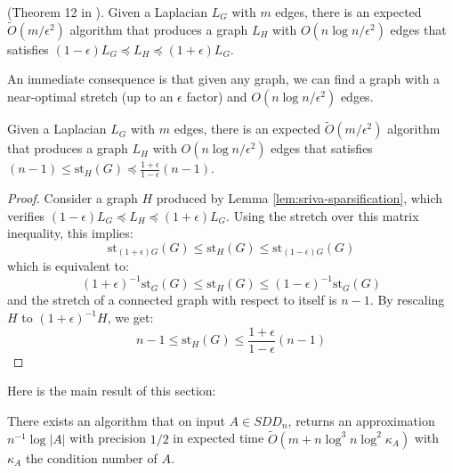 \begin{lemma}\label{lem:sriva-sparsification}(Theorem 12 in \cite{Spielman2009}).
Given a Laplacian $L_{G}$ with $m$ edges, there is an expected $\tilde{O}\left(m/\epsilon^{2}\right)$
algorithm that produces a graph $L_{H}$ with $O\left(n\log n/\epsilon^{2}\right)$
edges that satisfies $\left(1-\epsilon\right)L_{G}\preceq L_{H}\preceq\left(1+\epsilon\right)L_{G}$.

\end{lemma}

An immediate consequence is that given any graph, we can find a graph
with a near-optimal stretch (up to an $\epsilon$ factor) and $O\left(n\log n/\epsilon^{2}\right)$
edges.

\begin{lemma}\label{lem:low-stretch-bounding}Given a Laplacian $L_{G}$
with $m$ edges, there is an expected $\tilde{O}\left(m/\epsilon^{2}\right)$
algorithm that produces a graph $L_{H}$ with $O\left(n\log n/\epsilon^{2}\right)$
edges that satisfies $\left(n-1\right)\leq\text{st}_{H}\left(G\right)\preceq\frac{1+\epsilon}{1-\epsilon}\left(n-1\right)$.

\end{lemma}

\begin{proof}Consider a graph $H$ produced by Lemma \ref{lem:sriva-sparsification},
which verifies $\left(1-\epsilon\right)L_{G}\preceq L_{H}\preceq\left(1+\epsilon\right)L_{G}$.
Using the stretch over this matrix inequality, this implies: 
\[
\text{st}_{\left(1+\epsilon\right)G}\left(G\right)\leq\text{st}_{H}\left(G\right)\leq\text{st}_{\left(1-\epsilon\right)G}\left(G\right)
\]
which is equivalent to: 
\[
\left(1+\epsilon\right)^{-1}\text{st}_{G}\left(G\right)\leq\text{st}_{H}\left(G\right)\leq\left(1-\epsilon\right)^{-1}\text{st}_{G}\left(G\right)
\]
and the stretch of a connected graph with respect to itself is $n-1$.
By rescaling $H$ to $\left(1+\epsilon\right)^{-1}H$, we get: 
\[
n-1\leq\text{st}_{H}\left(G\right)\leq\frac{1+\epsilon}{1-\epsilon}\left(n-1\right)
\]


\end{proof}

Here is the main result of this section:

\begin{proposition}There exists an algorithm that on input $A\in SDD_{n}$,
returns an approximation $n^{-1}\log\left|A\right|$ with precision
$1/2$ in expected time $\tilde{O}\left(m+n\log^{3}n\log^{2}\kappa_{A}\right)$
with $\kappa_{A}$ the condition number of $A$.

\end{proposition}

